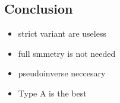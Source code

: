 





\subsection{Conclusion}

\begin{itemize}
  \item strict variant are useless 
  \item full smmetry is not needed
  \item pseudoinverse neccesary
  \item Type A is the best
\end{itemize}
